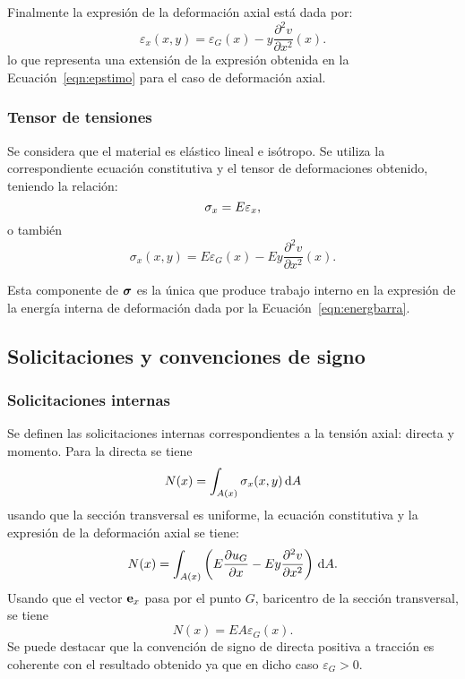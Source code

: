Finalmente la expresión de la deformación axial está dada por:
%
\begin{equation}\label{eqn:epsdef}
\boxed{
\varepsilon_x(x,y) =  \varepsilon_G (x) -y \frac{\partial^2 v}{\partial x^2}(x).
}
\end{equation}
lo que representa una extensión de la expresión obtenida en la Ecuación~\eqref{eqn:epstimo} para el caso de deformación axial.




\subsubsection{Tensor de tensiones}

Se considera que el material es elástico lineal e isótropo. Se utiliza la correspondiente ecuación constitutiva y el tensor de deformaciones obtenido, teniendo la relación:
%
\begin{equation}
  \sigma_x = E \varepsilon_x,
\end{equation}
o también
\begin{equation}
	\sigma_x (x,y) =  E \varepsilon_G(x) - E y \frac{\partial^2 v}{\partial x^2} (x).
\end{equation}

Esta componente de $\boldsymbol{\sigma}$ es la única que produce trabajo interno en la expresión de la energía interna de deformación dada por la Ecuación~\eqref{eqn:energbarra}.

\subsection{Solicitaciones y convenciones de signo}


\subsubsection{Solicitaciones internas}

Se definen las solicitaciones internas correspondientes a la tensión axial: directa y momento. %
%
Para la directa se tiene
%
\begin{equation}
N (x) = \int_{A(x)} \sigma_x (x,y) \, {\text{d}} A
\end{equation}
%
usando que la sección transversal es uniforme, la ecuación constitutiva y la expresión de la deformación axial se tiene:
%
\begin{equation}
N (x) = \int_{A(x)} \left( E \frac{\partial u_G}{\partial x} - E y \frac{\partial^2 v}{\partial x^2}   \right) \, {\text{d}} A.
\end{equation}
%
Usando que el vector ${\bf e}_x$ pasa por el punto $G$, baricentro de la sección transversal, se tiene
%
\begin{equation}\label{eqn:direc}
\boxed{
N (x) =  E A  \varepsilon_G(x).
}
\end{equation}
%
Se puede destacar que la convención de signo de directa positiva a tracción es coherente con el resultado obtenido ya que en dicho caso $\varepsilon_G >0$.

